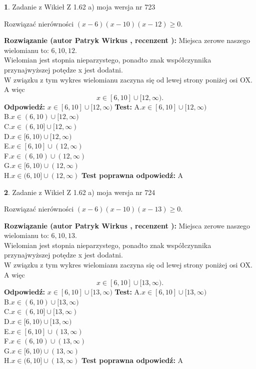 \documentclass[12pt, a4paper]{article}
\theoremstyle{definition} %
\newtheorem{zad}{}
\newcommand{\zadStart}[1]{\begin{zad}#1\newline}
\newcommand{\zadStop}{\end{zad}}
\newcommand{\rozwStart}[2]{\noindent \textbf{Rozwiązanie (autor #1 , recenzent #2): }\newline}
\newcommand{\rozwStop}{\newline}
\newcommand{\odpStart}{\noindent \textbf{Odpowiedź:}\newline}
\newcommand{\odpStop}{\newline}
\newcommand{\testStart}{\noindent \textbf{Test:}\newline}
\newcommand{\testStop}{\newline}
\newcommand{\kluczStart}{\noindent \textbf{Test poprawna odpowiedź:}\newline}
\newcommand{\kluczStop}{\newline}
\begin{document}
\zadStart{Zadanie z Wikieł Z 1.62 a) moja wersja nr 723}

Rozwiązać nierówności $(x-6)(x-10)(x-12)\ge0$.
\zadStop
\rozwStart{Patryk Wirkus}{}
Miejsca zerowe naszego wielomianu to: $6, 10, 12$.\\
Wielomian jest stopnia nieparzystego, ponadto znak współczynnika przy\linebreak najwyższej potędze x jest dodatni.\\ W związku z tym wykres wielomianu zaczyna się od lewej strony poniżej osi OX. A więc $$x \in [6,10] \cup [12,\infty).$$
\rozwStop
\odpStart
$x \in [6,10] \cup [12,\infty)$
\odpStop
\testStart
A.$x \in [6,10] \cup [12,\infty)$\\
B.$x \in (6,10) \cup [12,\infty)$\\
C.$x \in (6,10] \cup [12,\infty)$\\
D.$x \in [6,10) \cup [12,\infty)$\\
E.$x \in [6,10] \cup (12,\infty)$\\
F.$x \in (6,10) \cup (12,\infty)$\\
G.$x \in [6,10) \cup (12,\infty)$\\
H.$x \in (6,10] \cup (12,\infty)$
\testStop
\kluczStart
A
\kluczStop



\zadStart{Zadanie z Wikieł Z 1.62 a) moja wersja nr 724}

Rozwiązać nierówności $(x-6)(x-10)(x-13)\ge0$.
\zadStop
\rozwStart{Patryk Wirkus}{}
Miejsca zerowe naszego wielomianu to: $6, 10, 13$.\\
Wielomian jest stopnia nieparzystego, ponadto znak współczynnika przy\linebreak najwyższej potędze x jest dodatni.\\ W związku z tym wykres wielomianu zaczyna się od lewej strony poniżej osi OX. A więc $$x \in [6,10] \cup [13,\infty).$$
\rozwStop
\odpStart
$x \in [6,10] \cup [13,\infty)$
\odpStop
\testStart
A.$x \in [6,10] \cup [13,\infty)$\\
B.$x \in (6,10) \cup [13,\infty)$\\
C.$x \in (6,10] \cup [13,\infty)$\\
D.$x \in [6,10) \cup [13,\infty)$\\
E.$x \in [6,10] \cup (13,\infty)$\\
F.$x \in (6,10) \cup (13,\infty)$\\
G.$x \in [6,10) \cup (13,\infty)$\\
H.$x \in (6,10] \cup (13,\infty)$
\testStop
\kluczStart
A
\kluczStop
\end{document}
